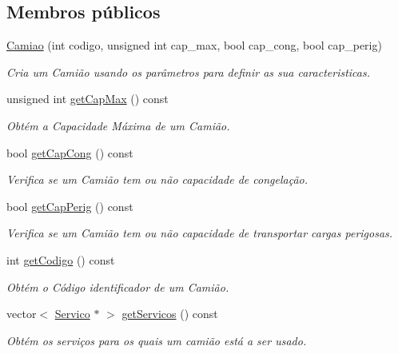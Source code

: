 \subsection*{Membros públicos}
\begin{DoxyCompactItemize}
\item 
\hyperlink{class_camiao_a9dbe2b8fd232262b23cb7817634ec9f2}{Camiao} (int codigo, unsigned int cap\+\_\+max, bool cap\+\_\+cong, bool cap\+\_\+perig)
\begin{DoxyCompactList}\small\item\em Cria um Camião usando os parâmetros para definir as sua caracteristicas. \end{DoxyCompactList}\item 
unsigned int \hyperlink{class_camiao_a95ab6ea48022557c3ffa5ac5f5f100d7}{get\+Cap\+Max} () const 
\begin{DoxyCompactList}\small\item\em Obtém a Capacidade Máxima de um Camião. \end{DoxyCompactList}\item 
bool \hyperlink{class_camiao_add0d42a0b4a15e9cd3f4b0626567bddf}{get\+Cap\+Cong} () const 
\begin{DoxyCompactList}\small\item\em Verifica se um Camião tem ou não capacidade de congelação. \end{DoxyCompactList}\item 
bool \hyperlink{class_camiao_ad779b545bf87564fb761a89cc0fdb5b2}{get\+Cap\+Perig} () const 
\begin{DoxyCompactList}\small\item\em Verifica se um Camião tem ou não capacidade de transportar cargas perigosas. \end{DoxyCompactList}\item 
int \hyperlink{class_camiao_ad193383e9f205676df51070eea748bb1}{get\+Codigo} () const 
\begin{DoxyCompactList}\small\item\em Obtém o Código identificador de um Camião. \end{DoxyCompactList}\item 
vector$<$ \hyperlink{class_servico}{Servico} $\ast$ $>$ \hyperlink{class_camiao_aa76342c254c9e9b9873d12b2280f5260}{get\+Servicos} () const 
\begin{DoxyCompactList}\small\item\em Obtém os serviços para os quais um camião está a ser usado. \end{DoxyCompactList}\item 

\end{DoxyCompactItemize}
